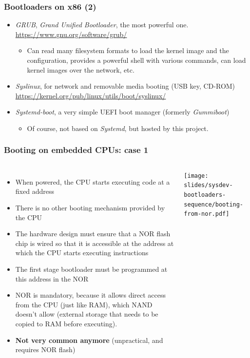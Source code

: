 \begin{frame}
  \frametitle{Bootloaders on x86 (2)}
  \begin{itemize}
  \item {\em GRUB}, {\em Grand Unified Bootloader}, the most powerful one.\\
    \url{https://www.gnu.org/software/grub/}
    \begin{itemize}
    \item Can read many filesystem formats to load the kernel image
      and the configuration, provides a powerful shell with various
      commands, can load kernel images over the network, etc.
    \end{itemize}
  \item {\em Syslinux}, for network and removable media booting (USB key, CD-ROM)\\
    \small\url{https://kernel.org/pub/linux/utils/boot/syslinux/}\normalsize
  \item {\em Systemd-boot}, a very simple UEFI boot manager (formerly {\em Gummiboot})
    \begin{itemize}
    \item Of course, not based on {\em Systemd}, but hosted by this project.
    \end{itemize}
  \end{itemize}
\end{frame}

\begin{frame}
  \frametitle{Booting on embedded CPUs: case 1}
  \begin{columns}
    \begin{itemize}
    \item When powered, the CPU starts executing code at a fixed address
    \item There is no other booting mechanism provided by the CPU
    \item The hardware design must ensure that a NOR flash chip is
      wired so that it is accessible at the address at which the CPU
      starts executing instructions
    \item The first stage bootloader must be programmed at this
      address in the NOR
    \item NOR is mandatory, because it allows direct access from the CPU
      (just like RAM), which NAND doesn't allow (external storage that
      needs to be copied to RAM before executing).
    \item {\bf Not very common anymore} (unpractical, and requires NOR
      flash)
    \end{itemize}
    \texttt{[image: slides/sysdev-bootloaders-sequence/booting-from-nor.pdf]}
  \end{columns}
\end{frame}

